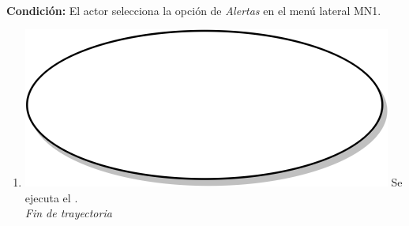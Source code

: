 \textbf{} \\
\textbf{Condición:} El actor selecciona la opción de \textit{Alertas} en el menú lateral MN1. \\
 \begin{enumerate}[label=G\arabic*]
    \item {\includegraphics[scale=.05]{Capitulo3/img/proceso.png} Se ejecuta el \textbf{}.} \\
    \textit{Fin de trayectoria} \\
\end{enumerate}